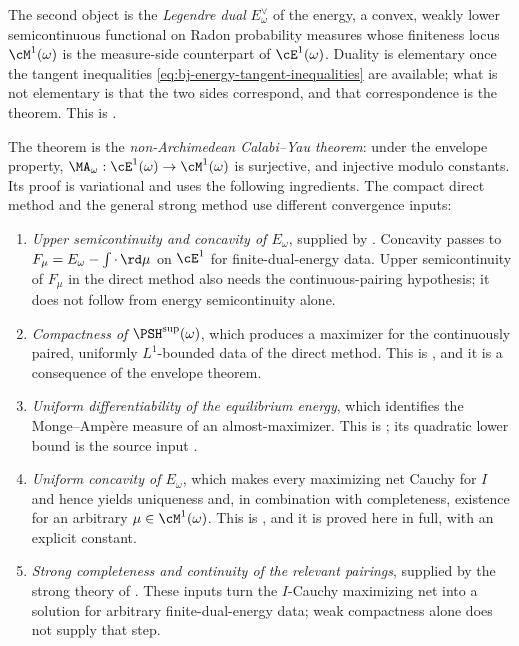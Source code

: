 The second object is the \emph{Legendre dual} $E^\vee_\omega$ of the
energy, a convex, weakly lower semicontinuous functional on Radon
probability measures whose finiteness locus $\cM^1(\omega)$ is the
measure-side counterpart of $\cE^1(\omega)$.  Duality is elementary once
the tangent inequalities \eqref{eq:bj-energy-tangent-inequalities} are
available; what is not elementary is that the two sides correspond, and
that correspondence is the theorem.  This is .

The theorem is the \emph{non-Archimedean Calabi--Yau theorem}: under the
envelope property, $\MA_\omega:\cE^1(\omega)\to\cM^1(\omega)$ is
surjective, and injective modulo constants.  Its proof is variational and
uses the following ingredients. The compact direct method and the general
strong method use different convergence inputs:

\begin{enumerate}
\item\label{itm:ch47-ingredient:usc}
      \emph{Upper semicontinuity and concavity of $E_\omega$},
      supplied by . Concavity passes to
      $F_\mu=E_\omega-\int\cdot\,\rd\mu$ on $\cE^1$ for finite-dual-energy
      data. Upper semicontinuity of $F_\mu$ in the direct method also needs
      the continuous-pairing hypothesis; it does not follow from energy
      semicontinuity alone.
\item\label{itm:ch47-ingredient:compact}
      \emph{Compactness of $\PSH^{\sup}(\omega)$}, which produces a
      maximizer for the continuously paired, uniformly $L^1$-bounded
      data of the direct method.  This is , and it is a
      consequence of the envelope theorem.
\item\label{itm:ch47-ingredient:diff}
      \emph{Uniform differentiability of the equilibrium energy}, which
      identifies the Monge--Amp\`ere measure of an almost-maximizer.  This
      is ; its quadratic lower
      bound is the source input \cite[Theorem~8.5]{BJ22}.
\item\label{itm:ch47-ingredient:concave}
      \emph{Uniform concavity of $E_\omega$}, which makes every
      maximizing net Cauchy for $I$ and hence yields uniqueness and, in
      combination with completeness, existence for an arbitrary
      $\mu\in\cM^1(\omega)$.  This is
      , and it is proved here in full, with
      an explicit constant.
\item\label{itm:ch47-ingredient:complete}
      \emph{Strong completeness and continuity of the relevant pairings},
      supplied by the strong theory of \cite[Sections~10 and~12]{BJ22}.
      These inputs turn the $I$-Cauchy maximizing net into a solution
      for arbitrary finite-dual-energy data; weak compactness alone
      does not supply that step.
\end{enumerate}

